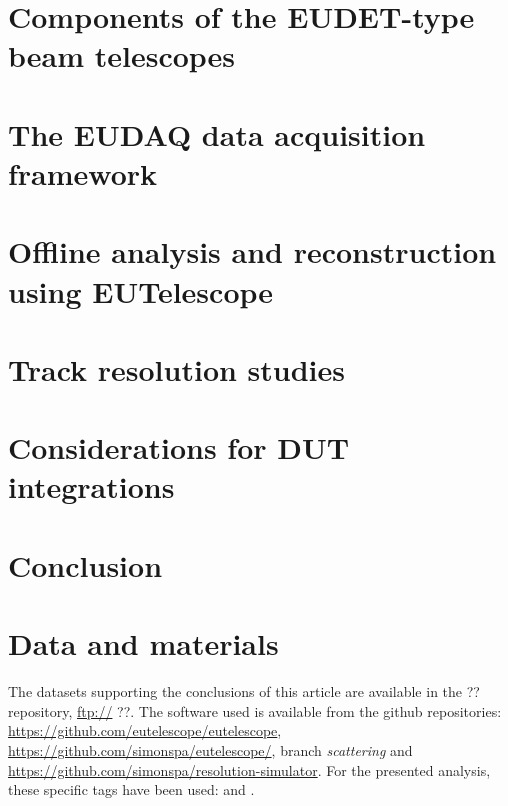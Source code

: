 \documentclass[a4paper,10pt]{article}
\newcommand*{\notFOREPJ}{}%
\begin{document}
\section{Components of the EUDET-type beam telescopes}
\label{sec:tscope}
\ifdefined\notFOREPJ

\else

\fi

\section{The EUDAQ data acquisition framework}
\label{sec:eudaq}
\ifdefined\notFOREPJ

\else

\fi

\section{Offline analysis and reconstruction using EUTelescope}
\label{sec:offline}
\ifdefined\notFOREPJ

\else

\fi

\section{Track resolution studies}
\label{sec:trackres}
\ifdefined\notFOREPJ

\else

\fi

\section{Considerations for DUT integrations}
\label{sec:dutintegration}
\ifdefined\notFOREPJ

\else

\fi

\section{Conclusion}
\label{sec:conclusion}
\ifdefined\notFOREPJ

\else

\fi

\section*{Data and materials}
The datasets supporting the conclusions of this article are available in the ?? repository, \url{ftp://} ??.
The software used is available from the github repositories: \url{https://github.com/eutelescope/eutelescope}, \url{https://github.com/simonspa/eutelescope/}, branch \textit{scattering}
 and \url{https://github.com/simonspa/resolution-simulator}.
For the presented analysis, these specific tags have been used: \cite{jansen_2016_49065} and \cite{spannagel_2016_48795}.
\end{document}
